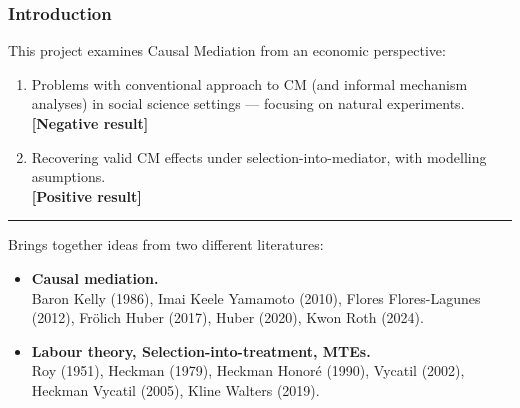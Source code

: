 \documentclass[dvipsnames]{beamer} %
\begin{document}
\begin{frame}
    \frametitle{Introduction}
    This project examines Causal Mediation from an economic perspective:
    \begin{enumerate}
        \item Problems with conventional approach to CM (and informal mechanism analyses) in social science settings --- focusing on natural experiments.
        \\ \textbf{[Negative result]}
        \item Recovering valid CM effects under selection-into-mediator, with modelling asumptions.
        \\ \textbf{[Positive result]}
    \end{enumerate}
    \par\noindent\rule{\textwidth}{0.4pt}
    Brings together ideas from two different literatures:
    \begin{itemize}
        \item \textbf{Causal mediation.}
        \\ Baron Kelly (1986), Imai Keele Yamamoto (2010), Flores Flores-Lagunes (2012), Fr\"olich Huber (2017), Huber (2020), Kwon Roth (2024).
        \item \textbf{Labour theory, Selection-into-treatment, MTEs.}
        \\ Roy (1951), Heckman (1979), Heckman Honor\'e (1990), Vycatil (2002), Heckman Vycatil (2005), Kline Walters (2019).
    \end{itemize}
\end{frame}%
\end{document}
